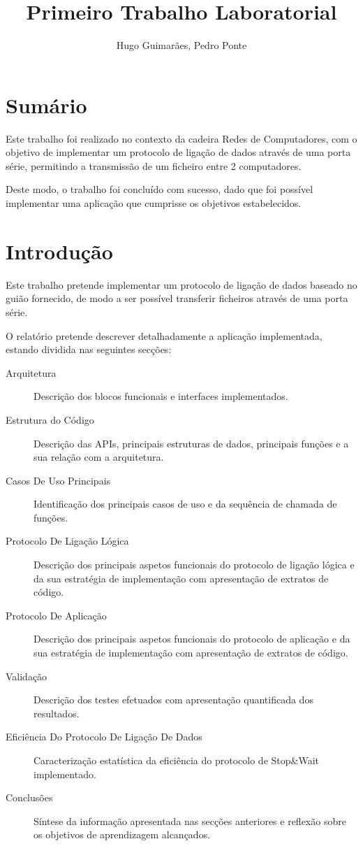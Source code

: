 \documentclass[11pt]{article}
\author{Hugo Guimarães, Pedro Ponte}
\title{Primeiro Trabalho Laboratorial}
\begin{document}
\maketitle 

\pagebreak
\section*{Sumário}

Este trabalho foi realizado no contexto da cadeira Redes de Computadores, com o objetivo de implementar um protocolo de  ligação de dados através de uma porta série, permitindo a transmissão de um ficheiro entre 2 computadores.
 
Deste modo, o trabalho foi concluído com sucesso, dado que foi possível implementar uma aplicação que cumprisse os objetivos estabelecidos.


\section{Introdução}

Este trabalho pretende implementar um protocolo de ligação de dados baseado no guião fornecido, de modo a ser possível transferir ficheiros através de uma porta série.

O relatório pretende descrever detalhadamente a aplicação implementada, estando dividida nas seguintes secções:
\begin{description}
	\item[Arquitetura] Descrição dos blocos funcionais e interfaces implementados.
	\item[Estrutura do Código] Descrição das APIs, principais estruturas de dados, principais funções e a sua relação com a arquitetura.
	\item[Casos De Uso Principais] Identificação dos principais casos de uso e da sequência de chamada de funções.
	\item[Protocolo De Ligação Lógica] Descrição dos principais aspetos funcionais do protocolo de ligação lógica e da sua estratégia de implementação com apresentação de extratos de código.
	\item[Protocolo De Aplicação] Descrição dos principais aspetos funcionais do protocolo de aplicação e da sua estratégia de implementação com apresentação de extratos de código.
	\item[Validação] Descrição dos testes efetuados com apresentação quantificada dos resultados.
	\item[Eficiência Do Protocolo De Ligação De Dados] Caracterização estatística da eficiência do protocolo de Stop\&Wait implementado.
	\item[Conclusões] Síntese da informação apresentada nas secções anteriores e reflexão sobre os objetivos de aprendizagem alcançados.
\end{description}
\end{document}
